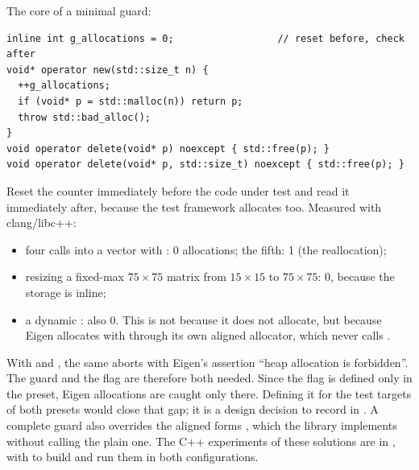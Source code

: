 \begin{solutions}
  \item The core of a minimal guard:
\begin{lstlisting}
inline int g_allocations = 0;                  // reset before, check after
void* operator new(std::size_t n) {
  ++g_allocations;
  if (void* p = std::malloc(n)) return p;
  throw std::bad_alloc();
}
void operator delete(void* p) noexcept { std::free(p); }
void operator delete(void* p, std::size_t) noexcept { std::free(p); }
\end{lstlisting}
        Reset the counter immediately before the code under test and read it immediately after, because the test framework allocates too. Measured
        with clang/libc++:
        \begin{itemize}
          \item four  calls into a vector with : 0 allocations; the fifth: 1 (the reallocation);
          \item resizing a fixed-max $75\times75$ matrix from $15\times15$ to $75\times75$: 0, because the storage is inline;
          \item a dynamic : also 0. This is not because it does not allocate, but because Eigen allocates with 
                through its own aligned allocator, which never calls .
        \end{itemize}
        With  and , the same  aborts with Eigen's assertion ``heap allocation is forbidden''. The guard and
        the flag are therefore both needed. Since the flag is defined only in the  preset, Eigen allocations are caught only there. Defining it for the
        test targets of both presets would close that gap; it is a design decision to record in . A complete guard also overrides the aligned
        forms , which the library implements without calling the plain one. The C++ experiments of these
        solutions are in , with  to build and run them in both configurations.


\end{solutions}
